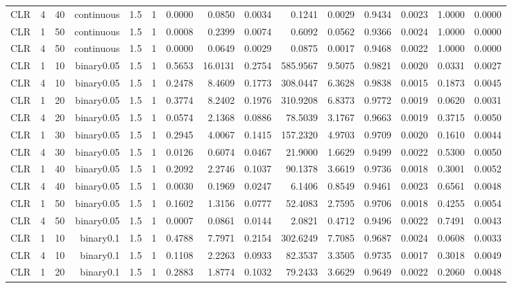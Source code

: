 \begin{longtable}{rrrrrrrrrrrrrrr}
  CLR & 4 & 40 & continuous & 1.5 & 1 & 0.0000 & 0.0850 & 0.0034 & 0.1241 & 0.0029 & 0.9434 & 0.0023 & 1.0000 & 0.0000 \\ 
  CLR & 1 & 50 & continuous & 1.5 & 1 & 0.0008 & 0.2399 & 0.0074 & 0.6092 & 0.0562 & 0.9366 & 0.0024 & 1.0000 & 0.0000 \\ 
  CLR & 4 & 50 & continuous & 1.5 & 1 & 0.0000 & 0.0649 & 0.0029 & 0.0875 & 0.0017 & 0.9468 & 0.0022 & 1.0000 & 0.0000 \\ 
  CLR & 1 & 10 & binary0.05 & 1.5 & 1 & 0.5653 & 16.0131 & 0.2754 & 585.9567 & 9.5075 & 0.9821 & 0.0020 & 0.0331 & 0.0027 \\ 
  CLR & 4 & 10 & binary0.05 & 1.5 & 1 & 0.2478 & 8.4609 & 0.1773 & 308.0447 & 6.3628 & 0.9838 & 0.0015 & 0.1873 & 0.0045 \\ 
  CLR & 1 & 20 & binary0.05 & 1.5 & 1 & 0.3774 & 8.2402 & 0.1976 & 310.9208 & 6.8373 & 0.9772 & 0.0019 & 0.0620 & 0.0031 \\ 
  CLR & 4 & 20 & binary0.05 & 1.5 & 1 & 0.0574 & 2.1368 & 0.0886 & 78.5039 & 3.1767 & 0.9663 & 0.0019 & 0.3715 & 0.0050 \\ 
  CLR & 1 & 30 & binary0.05 & 1.5 & 1 & 0.2945 & 4.0067 & 0.1415 & 157.2320 & 4.9703 & 0.9709 & 0.0020 & 0.1610 & 0.0044 \\ 
  CLR & 4 & 30 & binary0.05 & 1.5 & 1 & 0.0126 & 0.6074 & 0.0467 & 21.9000 & 1.6629 & 0.9499 & 0.0022 & 0.5300 & 0.0050 \\ 
  CLR & 1 & 40 & binary0.05 & 1.5 & 1 & 0.2092 & 2.2746 & 0.1037 & 90.1378 & 3.6619 & 0.9736 & 0.0018 & 0.3001 & 0.0052 \\ 
  CLR & 4 & 40 & binary0.05 & 1.5 & 1 & 0.0030 & 0.1969 & 0.0247 & 6.1406 & 0.8549 & 0.9461 & 0.0023 & 0.6561 & 0.0048 \\ 
  CLR & 1 & 50 & binary0.05 & 1.5 & 1 & 0.1602 & 1.3156 & 0.0777 & 52.4083 & 2.7595 & 0.9706 & 0.0018 & 0.4255 & 0.0054 \\ 
  CLR & 4 & 50 & binary0.05 & 1.5 & 1 & 0.0007 & 0.0861 & 0.0144 & 2.0821 & 0.4712 & 0.9496 & 0.0022 & 0.7491 & 0.0043 \\ 
  CLR & 1 & 10 & binary0.1 & 1.5 & 1 & 0.4788 & 7.7971 & 0.2154 & 302.6249 & 7.7085 & 0.9687 & 0.0024 & 0.0608 & 0.0033 \\ 
  CLR & 4 & 10 & binary0.1 & 1.5 & 1 & 0.1108 & 2.2263 & 0.0933 & 82.3537 & 3.3505 & 0.9735 & 0.0017 & 0.3018 & 0.0049 \\ 
  CLR & 1 & 20 & binary0.1 & 1.5 & 1 & 0.2883 & 1.8774 & 0.1032 & 79.2433 & 3.6629 & 0.9649 & 0.0022 & 0.2060 & 0.0048 \\ 

\end{longtable}
